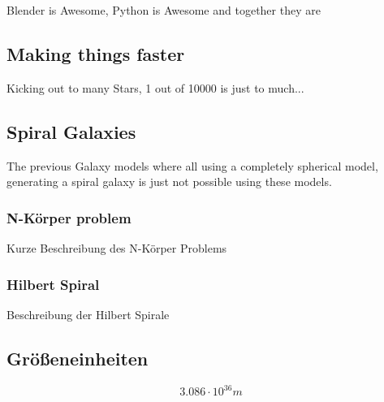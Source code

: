 Blender is Awesome, Python is Awesome and together they are

\subsection{Making things faster}

Kicking out to many Stars, 1 out of 10000 is just to much...

\subsection{Spiral Galaxies}

The previous Galaxy models where all using a completely spherical model, generating
a spiral galaxy is just not possible using these models.

\subsubsection{N-Körper problem}

Kurze Beschreibung des N-Körper Problems

\subsubsection{Hilbert Spiral}

Beschreibung der Hilbert Spirale

\subsection{Größeneinheiten}

\begin{equation}
  3.086 \cdot 10^{36} m
\end{equation}
